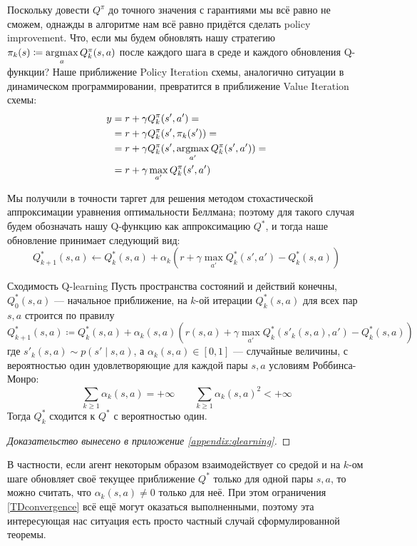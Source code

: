 Поскольку довести $Q^{\pi}$ до точного значения с гарантиями мы всё равно не сможем, однажды в алгоритме нам всё равно придётся сделать policy improvement. Что, если мы будем обновлять нашу стратегию $\pi_k(s) \coloneqq \mathop{\mathrm{argmax}}\limits_a Q^{\pi}_k(s, a)$ после каждого шага в среде и каждого обновления Q-функции? Наше приближение Policy Iteration схемы, аналогично ситуации в динамическом программировании, превратится в приближение Value Iteration схемы:
\begin{align*}
y &= r + \gamma Q^{\pi}_k(s', a') = \\
&= r + \gamma Q^{\pi}_k(s', \pi_k(s')) = \\
&= r + \gamma Q^{\pi}_k(s', \mathop{\mathrm{argmax}}_{a'} Q^{\pi}_k(s', a')) = \\
&= r + \gamma \max_{a'} Q^{\pi}_k(s', a')
\end{align*}

Мы получили в точности таргет для решения методом стохастической аппроксимации уравнения оптимальности Беллмана; поэтому для такого случая будем обозначать нашу Q-функцию как аппроксимацию $Q^*$, и тогда наше обновление принимает следующий вид:
\begin{equation}\label{Qlearningupdate}
Q^*_{k+1}(s, a) \leftarrow Q^{*}_k(s, a) + \alpha_k \left( r + \gamma \max_{a'} Q^{*}_k(s', a') - 
Q^{*}_k(s, a) \right) 
\end{equation}

\begin{theoremBox}[label=th:TDconvergencetheorem]{Сходимость Q-learning}
Пусть пространства состояний и действий конечны, $Q^*_0(s, a)$ --- начальное приближение, на $k$-ой итерации $Q^*_k(s, a)$ для всех пар $s, a$ строится по правилу
$$Q^*_{k+1}(s, a) \coloneqq Q^*_k(s, a) + \alpha_k(s, a) \left( r(s, a) + \gamma \max_{a'} Q^*_k(s'_k(s, a), a') - Q^*_k(s, a)\right)$$
где $s'_k(s, a) \sim p(s' \mid s, a)$, а $\alpha_k(s, a) \in [0, 1]$ --- случайные величины, с вероятностью один удовлетворяющие для каждой пары $s, a$ условиям Роббинса-Монро:
\begin{equation}\label{TDconvergence}
\sum_{k \ge 1} \alpha_k(s, a) = +\infty \qquad \sum_{k \ge 1} \alpha_k(s, a)^2 < +\infty
\end{equation}
Тогда $Q^*_k$ сходится к $Q^*$ с вероятностью один.
\begin{proof}[Доказательство вынесено в приложение \ref{appendix:qlearning}]
\end{proof}
\end{theoremBox}

В частности, если агент некоторым образом взаимодействует со средой и на $k$-ом шаге обновляет своё текущее приближение $Q^*$ только для одной пары $s, a$, то можно считать, что $\alpha_k(s, a) \ne 0$ только для неё. При этом ограничения \eqref{TDconvergence} всё ещё могут оказаться выполненными, поэтому эта интересующая нас ситуация есть просто частный случай сформулированной теоремы.

